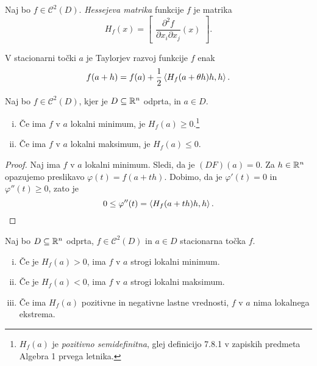 \begin{definicija}
Naj bo $f \in \mathcal{C}^2(D)$.
\emph{Hessejeva matrika}
funkcije $f$ je matrika
\[
H_f(x) = \begin{bmatrix}
\dfrac{\partial^2 f}{\partial x_i \partial x_j}(x)
\end{bmatrix}.
\]
\end{definicija}

\begin{opomba}
V stacionarni točki $a$ je Taylorjev razvoj funkcije $f$ enak
\[
f(a+h) = f(a) + \frac{1}{2} \left\langle H_f(a + \theta h)h,h\right\rangle.
\]
\end{opomba}

\begin{trditev}\label{td:2}
Naj bo $f \in \mathcal{C}^2(D)$, kjer je $D \subseteq \mathbb{R}^n$ odprta,
in $a \in D$.

\begin{enumerate}[i)]
\item Če ima $f$ v $a$ lokalni minimum, je
$H_f(a) \geq 0$.\footnote{$H_f(a)$ je \emph{pozitivno
semidefinitna}, glej definicijo 7.8.1 v zapiskih predmeta Algebra 1
prvega letnika.}
\item Če ima $f$ v $a$ lokalni maksimum, je $H_f(a) \leq 0$.
\end{enumerate}
\end{trditev}

\begin{proof}
Naj ima $f$ v $a$ lokalni minimum. Sledi, da je $(DF)(a) = 0$. Za
$h \in \mathbb{R}^n$ opazujemo preslikavo $\varphi(t)=f(a + th)$. Dobimo,
da je $\varphi'(t) = 0$ in $\varphi''(t) \geq 0$, zato je
\[
0 \leq \varphi''(t) = \left\langle H_f(a + th)h, h\right\rangle. \qedhere
\]
\end{proof}

\begin{izrek}
Naj bo $D \subseteq \mathbb{R}^n$ odprta, $f \in \mathcal{C}^2(D)$ in
$a \in D$ stacionarna točka $f$.

\begin{enumerate}[i)]
\item Če je $H_f(a) > 0$, ima $f$ v $a$ strogi lokalni minimum.
\item Če je $H_f(a) < 0$, ima $f$ v $a$ strogi lokalni maksimum.
\item Če ima $H_f(a)$ pozitivne in negativne lastne vrednosti, $f$
v $a$ nima lokalnega ekstrema.
\end{enumerate}
\end{izrek}

